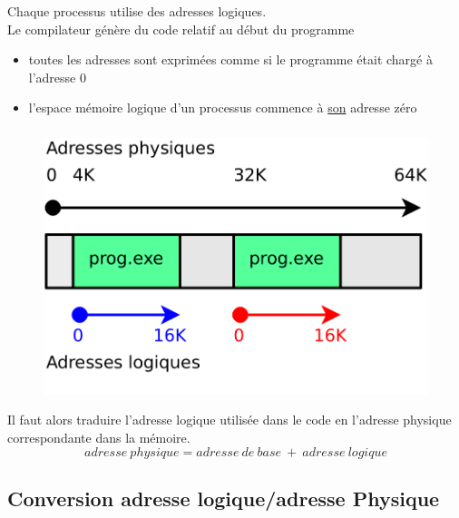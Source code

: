 \begin{frame}
  \frametitle{\insertsubsection}
  Chaque processus utilise des \alert{adresses logiques}. \\
  
  Le compilateur génère du \alert{code relatif} au début du programme
  \begin{itemize}
  \item toutes les adresses sont exprimées comme si le programme était chargé à
    l'adresse 0
  \item[\ding{212}] l'\alert{espace mémoire logique} d'un processus commence à
    \underline{son} adresse zéro 
  \end{itemize}
\end{frame}

\begin{frame}
  \frametitle{\insertsubsection}
  \begin{figure}
    \includegraphics[width=0.7\linewidth]{fig2/indep-code-adr-logique}
  \end{figure}
  Il faut alors traduire l'\alert{adresse logique} utilisée dans le code en
  l'\alert{adresse physique} correspondante dans la mémoire. \\
  \vspace{-0.5cm}
$$adresse~physique = adresse~de~base~ +~ adresse~logique$$
\end{frame}

\subsection{Conversion adresse logique/adresse Physique}

